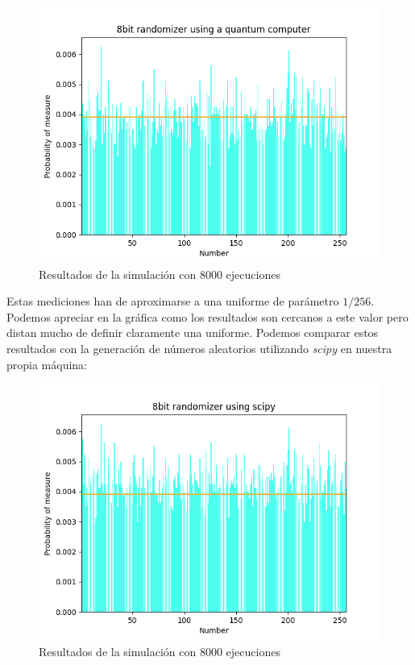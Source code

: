 \documentclass[11pt]{article}
\begin{document}
\begin{figure}[H]
	\centering
	\includegraphics[scale=0.8]{figures/barplot_quantum.png}
	\caption{Resultados de la simulación con 8000 ejecuciones}
\end{figure}

Estas mediciones han de aproximarse a una uniforme de parámetro $1/256$. Podemos apreciar en la gráfica como los resultados son cercanos a este valor pero distan mucho de definir claramente una uniforme. Podemos comparar estos resultados con la generación de números aleatorios utilizando \emph{scipy} en nuestra propia máquina:

\begin{figure}[H]
	\centering
	\includegraphics[scale=0.8]{figures/barplot_scipy.png}
	\caption{Resultados de la simulación con 8000 ejecuciones}
\end{figure}
\end{document}
